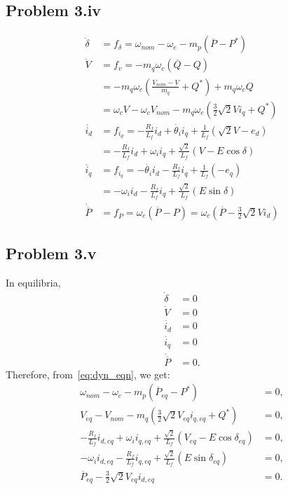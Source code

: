 \subsection*{Problem 3.iv}
\begin{align}\label{eq:dyn_eqn}
	\dot{\delta} &= f_{\delta} = \omega_{nom}-\omega_e - m_p(\overline{P}-P^*) \nonumber\\
	\dot{V} &= f_v = -m_q\omega_c(\overline{Q}-Q) \nonumber\\
	&= -m_q\omega_c\left(\frac{V_{nom}-V}{m_q}+Q^*\right)+m_q\omega_cQ \nonumber\\
	&= \omega_cV-\omega_cV_{nom}-m_q\omega_c\left(\frac{3}{2}\sqrt{2}Vi_q+Q^*\right) \nonumber\\
	\dot{i_d} &= f_{i_d} = -\frac{R_f}{L_f}i_d+\dot{\theta_i}i_q+\frac{1}{L_f}(\sqrt{2}V-e_d) \nonumber\\
	&= -\frac{R_f}{L_f}i_d + \omega_i i_q + \frac{\sqrt{2}}{L_f}(V-E\cos \delta) \nonumber\\
	\dot{i_q} &= f_{i_q} = -\dot{\theta_i}i_d-\frac{R_f}{L_f}i_q+\frac{1}{L_f}(-e_q)\nonumber\\
	&= -\omega_i i_d-\frac{R_f}{L_f}i_q + \frac{\sqrt{2}}{L_f}(E\sin \delta) \nonumber\\
	\dot{\overline{P}} &= f_{\overline{P}} = \omega_c(\overline{P}-P) = \omega_c\left(\overline{P}-\frac{3}{2}\sqrt{2}Vi_d\right)
\end{align}
\subsection*{Problem 3.v}
In equilibria,
\begin{align*}
	\dot{\delta} &= 0\\
	\dot{V} &= 0\\
	\dot{i_d} &= 0\\
	\dot{i_q} &= 0\\
	\dot{\overline{P}} &= 0.
\end{align*}
Therefore, from~\ref{eq:dyn_eqn}, we get:
\begin{align*}
	\omega_{nom} - \omega_c -m_p(\overline{P}_{eq}-P^*) &= 0,\\
	V_{eq}-V_{nom}-m_q\left(\frac{3}{2}\sqrt{2}V_{eq}i_{q,eq}+Q^*\right) &= 0,\\
	-\frac{R_f}{L_f}i_{d,eq}+\omega_i i_{q,eq}+\frac{\sqrt{2}}{L_f}(V_{eq}-E\cos \delta_{eq}) &= 0,\\
	-\omega_i i_{d,eq} -\frac{R_f}{L_f}i_{q,eq} + \frac{\sqrt{2}}{L_f}(E\sin \delta_{eq}) &= 0,\\
	\overline{P}_{eq}-\frac{3}{2}\sqrt{2}V_{eq}i_{d,eq} &= 0.
\end{align*}
